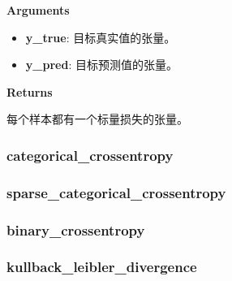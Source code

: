 \textbf{Arguments}

\begin{itemize}
\tightlist
\item
  \textbf{y\_true}: 目标真实值的张量。
\item
  \textbf{y\_pred}: 目标预测值的张量。
\end{itemize}

\textbf{Returns}

每个样本都有一个标量损失的张量。



\subsubsection{categorical\_crossentropy}\label{categoricalux5fcrossentropy}

\begin{Shaded}
\begin{Highlighting}[]
\end{Highlighting}
\end{Shaded}



\subsubsection{sparse\_categorical\_crossentropy}\label{sparseux5fcategoricalux5fcrossentropy}

\begin{Shaded}
\begin{Highlighting}[]
\end{Highlighting}
\end{Shaded}



\subsubsection{binary\_crossentropy}\label{binaryux5fcrossentropy}

\begin{Shaded}
\begin{Highlighting}[]
\end{Highlighting}
\end{Shaded}



\subsubsection{kullback\_leibler\_divergence}\label{kullbackux5fleiblerux5fdivergence}


